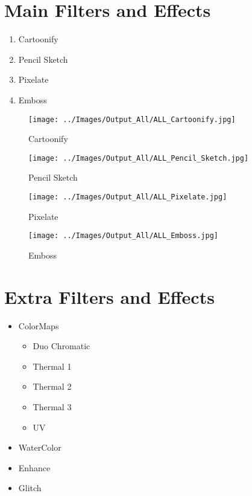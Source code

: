 \onecolumn
\chapter{Main Filters and Effects}
\label{MainEffectsAppendix}

\begin{enumerate}
	\item Cartoonify
	\item Pencil Sketch
	\item Pixelate
	\item Emboss
\end{enumerate}


\begin{figure}[h]
	\caption{Cartoonify}
	\centering
	\texttt{[image: ../Images/Output\_All/ALL\_Cartoonify.jpg]}
	\label{ALLCartoonify}
\end{figure}


\begin{figure}[h]
	\caption{Pencil Sketch}
	\centering
	\texttt{[image: ../Images/Output\_All/ALL\_Pencil\_Sketch.jpg]}
	\label{ALLPencilSKetch}
\end{figure}


\begin{figure}[h]
	\caption{Pixelate}
	\centering
	\texttt{[image: ../Images/Output\_All/ALL\_Pixelate.jpg]}
	\label{ALLPixelate}
\end{figure}

\begin{figure}[h]
	\caption{Emboss}
	\centering
	\texttt{[image: ../Images/Output\_All/ALL\_Emboss.jpg]}
	\label{ALLEmboss}
\end{figure}





\chapter{Extra Filters and Effects}
\label{ExtraEffectsAppendix}

\begin{itemize}
	\item ColorMaps
	\begin{itemize}
		\item Duo Chromatic
		\item Thermal 1
		\item Thermal 2
		\item Thermal 3
		\item UV
	\end{itemize}
	\item WaterColor
	\item Enhance
	\item Glitch
\end{itemize}

